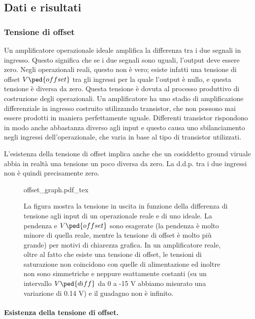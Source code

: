 \subsection{Dati e risultati}

\subsubsection{Tensione di offset}

Un amplificatore operazionale ideale amplifica la differenza tra i due segnali
in ingresso. Questo significa che se i due segnali sono uguali, l'output deve essere zero.
Negli operazionali reali, questo non è vero; esiste infatti una tensione di offset
$V\ped{offset}$ tra gli ingressi per la quale l'output è nullo, e questa tensione è diversa da zero.
Questa tensione è dovuta al processo produttivo di costruzione degli operazionali.
Un amplificatore ha uno stadio di amplificazione differenziale in ingresso costruito utilizzando
transistor, che non possono mai essere prodotti in maniera perfettamente uguale. Differenti
transistor rispondono in modo anche abbastanza diverso agli input e questo causa uno sbilanciamento
negli ingressi dell'operazionale, che varia in base al tipo di transistor utilizzati.

L'esistenza della tensione di offset implica anche che un cosiddetto ground viruale
abbia in realtà una tensione un poco diversa da zero. La d.d.p. tra i due ingressi non è quindi
precisamente zero.

\begin{figure}[t!]
    \def\svgwidth{0.5\textwidth}
    {offset_graph.pdf_tex}
    \caption{La figura mostra la tensione in uscita in funzione della differenza di tensione agli input di 
        un operazionale reale e di uno ideale. La pendenza e $V\ped{offset}$ sono esagerate
        (la pendenza è molto minore di quella reale, mentre la tensione di offset è molto più grande) per
        motivi di chiarezza grafica. In un amplificatore reale, oltre
        al fatto che esiste una tensione di offset, le tensioni di saturazione non coincidono con quelle
        di alimentazione ed inoltre non sono simmetriche e neppure esattamente costanti (su un intervallo
        $V\ped{diff}$ da 0 a -15 V abbiamo misurato una variazione di 0.14 V) e il guadagno non è infinito. }
    \label{fig:v_offset_graph}
\end{figure}

\paragraph{Esistenza della tensione di offset.}

